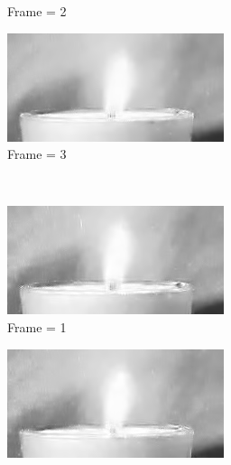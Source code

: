 \documentclass[a4paper, landscape]{article}
\begin{document}
\begin{figure}[H]
\begin{subfigure}{0.13\linewidth}
		\caption{Frame = 2}
	\end{subfigure}
	\begin{subfigure}{0.13\linewidth}
		\centering
		\includegraphics[width=\linewidth]{flame/reconstructed, T = 3, frame = 3.png}
		\caption{Frame = 3}
	\end{subfigure}\\
	\begin{subfigure}{0.13\linewidth}
		\centering
		\includegraphics[width=\linewidth]{flame/reconstructed, T = 5, frame = 1.png}
		\caption{Frame = 1}
	\end{subfigure}
	\begin{subfigure}{0.13\linewidth}
		\centering
		\includegraphics[width=\linewidth]{flame/reconstructed, T = 5, frame = 2.png}

\end{subfigure}
\end{figure}
\end{document}
